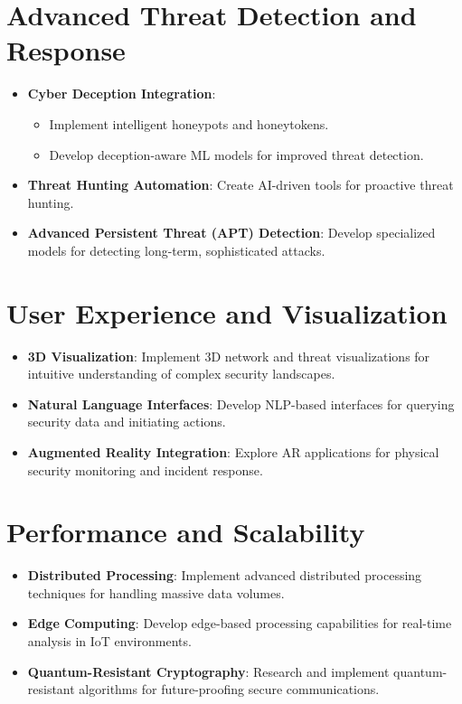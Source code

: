 \section{Advanced Threat Detection and Response}
\begin{itemize}
    \item \textbf{Cyber Deception Integration}:
    \begin{itemize}
        \item Implement intelligent honeypots and honeytokens.
        \item Develop deception-aware ML models for improved threat detection.
    \end{itemize}
    \item \textbf{Threat Hunting Automation}: Create AI-driven tools for proactive threat hunting.
    \item \textbf{Advanced Persistent Threat (APT) Detection}: Develop specialized models for detecting long-term, sophisticated attacks.
\end{itemize}

\section{User Experience and Visualization}
\begin{itemize}
    \item \textbf{3D Visualization}: Implement 3D network and threat visualizations for intuitive understanding of complex security landscapes.
    \item \textbf{Natural Language Interfaces}: Develop NLP-based interfaces for querying security data and initiating actions.
    \item \textbf{Augmented Reality Integration}: Explore AR applications for physical security monitoring and incident response.
\end{itemize}

\section{Performance and Scalability}
\begin{itemize}
    \item \textbf{Distributed Processing}: Implement advanced distributed processing techniques for handling massive data volumes.
    \item \textbf{Edge Computing}: Develop edge-based processing capabilities for real-time analysis in IoT environments.
    \item \textbf{Quantum-Resistant Cryptography}: Research and implement quantum-resistant algorithms for future-proofing secure communications.
\end{itemize}

